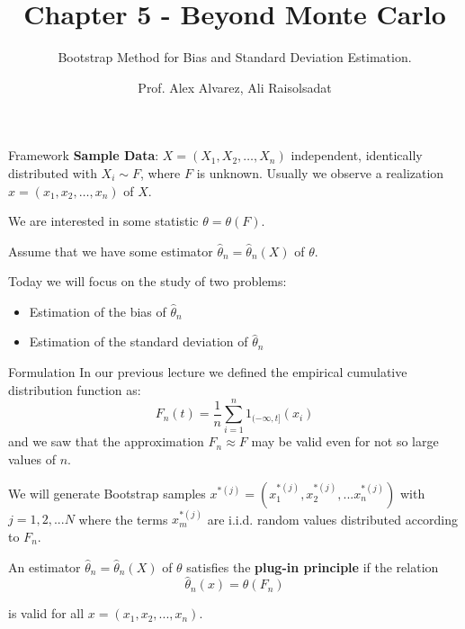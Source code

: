 \documentclass[8pt]{beamer}
\title{Chapter 5 - Beyond Monte Carlo}
\subtitle{Bootstrap Method for Bias and Standard Deviation Estimation.}
\author{Prof. Alex Alvarez, Ali Raisolsadat}
\institute{School of Mathematical and Computational Sciences \\ University of Prince Edward Island}
\date{} %
\begin{document}
\maketitle

\begin{frame}{Framework}
\textbf{Sample Data}: $X=(X_1, X_2, \ldots, X_n)$ independent, identically distributed with $X_i \sim F$, where $F$ is unknown. Usually we observe a realization $x=(x_1,x_2,\ldots, x_n)$ of $X$.

\vspace{3mm}

We are interested in some statistic $\theta=\theta(F)$.

\vspace{3mm}
 
Assume that we have some estimator $\widehat{\theta}_n=\widehat{\theta}_n(X)$  of $\theta$. 

\vspace{3mm}
 
Today we will focus on the study of two problems:

\begin{itemize}
\item Estimation of the bias of $\widehat{\theta}_n$
\item Estimation of the standard deviation of $\widehat{\theta}_n$
\end{itemize}
\end{frame}

\begin{frame}{Formulation}
In our previous lecture we defined the empirical cumulative distribution function  as:
\begin{equation*}
F_n(t)=\frac{1}{n}\sum_{i=1}^n 1_{(-\infty,t]}(x_i)
\end{equation*}
and we saw that the approximation $F_n \approx F$  may be valid even for not so large values of $n$.

\vspace{2mm}

We will generate Bootstrap samples $x^{*(j)}=\left(x^{*(j)}_1, x^{*(j)}_2,... x^{*(j)}_n\right)$ with $j=1,2,...N$  where the terms $x^{*(j)}_{m}$ are i.i.d. random values distributed according to $F_n$.

\vspace{2mm}

An estimator $\widehat{\theta}_n=\widehat{\theta}_n(X)$  of $\theta$
satisfies the {\bf plug-in principle } if the relation
\begin{equation*}
\widehat{\theta}_n(x)=\theta(F_n)
\end{equation*}

is valid for all $x=(x_1,x_2,...,x_n)$.
\end{frame}
\end{document}
